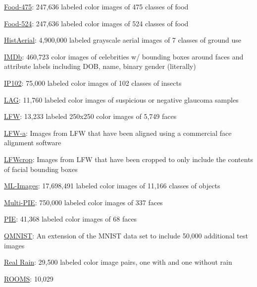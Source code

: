\documentclass{tufte-handout}
\begin{document}
\item
  \href{http://www.ivl.disco.unimib.it/activities/food475db/}{Food-475}:
  247,636 labeled color images of 475 classes of food
\item
  \href{http://www.ivl.disco.unimib.it/activities/food524db/}{Food-524}:
  247,636 labeled color images of 524 classes of food
\item
  \href{http://eidolon.univ-lyon2.fr/~remi1/HistAerialDataset/}{HistAerial}:
  4,900,000 labeled grayscale aerial images of 7 classes of ground use
\item
  \href{https://data.vision.ee.ethz.ch/cvl/rrothe/imdb-wiki/}{IMDb}:
  460,723 color images of celebrities w/ bounding boxes around faces and
  attribute labels including DOB, name, binary gender (literally)
\item
  \href{https://github.com/xpwu95/IP102}{IP102}: 75,000 labeled color
  images of 102 classes of insects
\item
  \href{https://github.com/smilell/AG-CNN}{LAG}: 11,760 labeled color
  images of suspicious or negative glaucoma samples
\item
  \href{http://vis-www.cs.umass.edu/lfw/index.html}{LFW}: 13,233 labeled
  250x250 color images of 5,749 faces
\item
  \href{https://talhassner.github.io/home/projects/lfwa/index.html}{LFW-a}:
  Images from LFW that have been aligned using a commercial face
  alignment software
\item
  \href{http://conradsanderson.id.au/lfwcrop/}{LFWcrop}: Images from LFW
  that have been cropped to only include the contents of facial bounding
  boxes
\item
  \href{https://github.com/Tencent/tencent-ml-images}{ML-Images}:
  17,698,491 labeled color images of 11,166 classes of objects
\item
  \href{http://www.cs.cmu.edu/afs/cs/project/PIE/MultiPie/Multi-Pie/Home.html}{Multi-PIE}:
  750,000 labeled color images of 337 faces
\item
  \href{https://www.ri.cmu.edu/project/pie-database/}{PIE}: 41,368
  labeled color images of 68 faces
\item
  \href{https://github.com/facebookresearch/qmnist}{QMNIST}: An
  extension of the MNIST data set to include 50,000 additional test
  images
\item
  \href{https://stevewongv.github.io/derain-project.html}{Real Rain}:
  29,500 labeled color image pairs, one with and one without rain
\item
  \href{https://dataturks.com/projects/sheerun/rooms}{ROOMS}: 10,029
\end{document}
